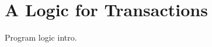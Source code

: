 \section{A Logic for Transactions}

Program logic intro.



\newpage



\newpage



\newpage



\newpage


